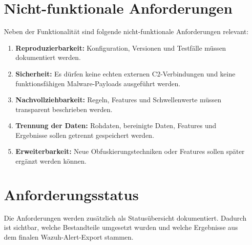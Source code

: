 \documentclass[12pt,a4paper,oneside,parskip=half]{scrreprt}
\begin{document}
\section{Nicht-funktionale Anforderungen}
Neben der Funktionalität sind folgende nicht-funktionale Anforderungen relevant:
\begin{enumerate}[label=NFA\arabic*]
    \item \textbf{Reproduzierbarkeit:} Konfiguration, Versionen und Testfälle müssen dokumentiert werden.
    \item \textbf{Sicherheit:} Es dürfen keine echten externen C2-Verbindungen und keine funktionsfähigen Malware-Payloads ausgeführt werden.
    \item \textbf{Nachvollziehbarkeit:} Regeln, Features und Schwellenwerte müssen transparent beschrieben werden.
    \item \textbf{Trennung der Daten:} Rohdaten, bereinigte Daten, Features und Ergebnisse sollen getrennt gespeichert werden.
    \item \textbf{Erweiterbarkeit:} Neue Obfuskierungstechniken oder Features sollen später ergänzt werden können.
\end{enumerate}

\section{Anforderungsstatus}
Die Anforderungen werden zusätzlich als Statusübersicht dokumentiert. Dadurch ist sichtbar, welche Bestandteile umgesetzt wurden und welche Ergebnisse aus dem finalen Wazuh-Alert-Export stammen.
\end{document}
